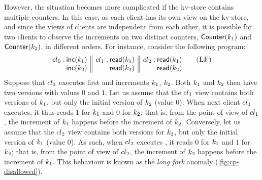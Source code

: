 However, the situation becomes more complicated if the kv-store contains multiple counters. 
In this case, as each client has its own view on the kv-store, and since the views 
of clients are independent from each other, it is possible for two 
clients to observe the increments on two distinct counters, $\mathsf{Counter}(k_1)$ and $\mathsf{Counter}(k_2)$, in different orders. 
For instance, consider the following program:
\begin{align}
	\begin{array}[t]{@{} r @{\hspace{2pt}} l || r @{\hspace{2pt}} l || r @{\hspace{2pt}} l @{}}
		\cl_0: 
		& \ctrinc(\ke_1) 
		& \cl_1: 
		& \ctrread(\ke_1)
		& \cl_2: 
		& \ctrread(\ke_1)\\
%
		& \ctrinc(\ke_2) 
		&& \ctrread(\ke_2)
		&& \ctrread(\ke_2)
	\end{array}
	\tag{\textsc{LF}}
	\label{prog:LF}
\end{align}
Suppose that ${cl}_0$ executes first and increments $k_1$, $k_2$. 
Both $k_1$ and $k_2$ then have two versions with values $0$ and $1$. 
Let us assume that the ${cl}_1$ view contains both versions of $k_1$, but only 
the initial version of $k_2$ (value $0$). 
When next client ${cl}_1$ executes, it thus reads $1$ for $k_1$ and $0$ for $k_2$; 
that is, from the point of view of ${cl}_1$, the increment of $k_1$ 
happens before the increment of $k_2$. 
Conversely, let us assume that the ${cl}_2$ view contains both versions for $k_2$, but only 
the initial version of $k_1$ (value $0$). 
As such, when ${cl}_2$ executes , it reads $0$ for $k_1$ and $1$ for $k_2$;
that is, from the point of view of ${cl}_2$, the increment of $k_2$ 
happens before the increment of $k_1$. 
This behaviour is known as the \emph{long fork} anomaly (\cref{fig:cp-disallowed}). 

